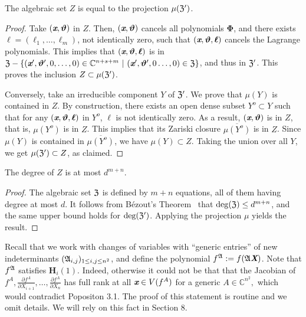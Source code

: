 \documentclass[sigconf]{acmart}
\def\Xb{\textit{\textbf{X}}}
\def\thetab{\bm{\vartheta}}
\def\fA{{\frak A}}
\def\xb{\textit{\textbf{x}}}
\def\C{\mathbb{C}}
\def\dt{s}
\def\pa{\partial}
\def\A{\frak{A}}
\begin{document}
\begin{lemma}  
  The algebraic set $Z$ is equal to the projection $\mu(\frak{Z}')$.
\end{lemma}
\begin{proof}
  Take $(\xb,\thetab)$ in $Z$. Then, $(\xb,\thetab)$ cancels all
  polynomials $\bm \Phi$, and there exists $\bm
  \ell=(\ell_1,\dots,\ell_m)$, not identically zero, such that
  $(\xb,\thetab,\bm \ell)$ cancels the Lagrange polynomials. This
  implies that $(\xb,\thetab,\bm \ell)$ is in $\frak{Z} -
  \{(\xb',\thetab',0,\hdots,0) \in
  \C^{n+\dt+m}~|~(\xb',\thetab',0\hdots,0) \in
  \frak{Z}\}$, and thus in $\frak{Z}'$. This proves the inclusion
  $Z \subset \mu(\frak{Z}')$.

  Conversely, take an irreducible component $Y$ of $\frak Z'$. We prove 
  that $\mu(Y)$ is contained in $Z$.
  By construction, there exists an open dense subset $Y^o \subset Y$
  such that for any $(\xb,\thetab,\bm \ell)$ in $Y^o$, $\bm \ell$ is
  not identically zero. As a result, $(\xb,\thetab)$ is in $Z$, that
  is, $\mu(Y^o)$ is in $Z$. This implies that its Zariski closure
  $\overline{\mu(Y^o)}$ is in $Z$. Since $\mu(Y)$ is contained in
  $\overline{\mu(Y^o)}$, we have $\mu(Y) \subset Z$. Taking 
  the union over all $Y$, we get $\mu(\frak Z') \subset Z$, as claimed.
\end{proof}
%
\begin{corollary} 
  The degree of $Z$ is at most $d^{m+n}.$
\end{corollary}
\begin{proof}
  The algebraic set $\frak Z$ is defined by $m+n$ equations, all of
  them having degree at most $d$. It follows from B\'ezout's
  Theorem~\cite{H} that $\deg(\frak{Z}) \leq d^{m+n}$, and the same
  upper bound holds for $\deg(\frak{Z}')$. Applying the projection
  $\mu$ yields the result.
\end{proof}

Recall that we work with changes of variables with ``generic entries'' of new indeterminants $(\frak
A_{i,j})_{1\le i,j \le n^2}$, and define the polynomial 
$f^\fA:=f(\fA \Xb)$. Note that $f^\A$ satisfies $\textbf{H}_i(1).$ Indeed, otherwise it could not be that that the Jacobian of $f^A,\frac{\pa f^A}{\pa X_{i+1}},\hdots,\frac{\pa f^A}{\pa X_n}$ has full rank at all $\xb \in V(f^A)$ for a generic $A \in \C^{n^2},$ which would contradict Popositon 3.1. The proof of this statement is routine and we omit details. We will rely on this
fact in Section 8.

\end{document}
